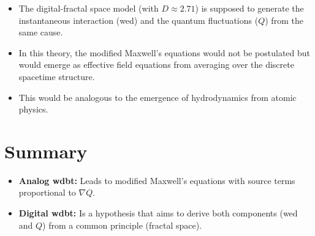 \begin{itemize}
    \item The digital-fractal space model (with $D \approx 2.71$) is supposed to generate the instantaneous interaction (\gls{wed}) and the quantum fluctuations ($Q$) from the same cause.
    \item In this theory, the modified Maxwell's equations would not be postulated but would emerge as effective field equations from averaging over the discrete spacetime structure.
    \item This would be analogous to the emergence of hydrodynamics from atomic physics.
\end{itemize}

\section{Summary}
\begin{itemize}
    \item \textbf{Analog \gls{wdbt}:} Leads to modified Maxwell's equations with source terms proportional to $\nabla Q$.
    \item \textbf{Digital \gls{wdbt}:} Is a hypothesis that aims to derive both components (\gls{wed} and $Q$) from a common principle (fractal space).
\end{itemize}